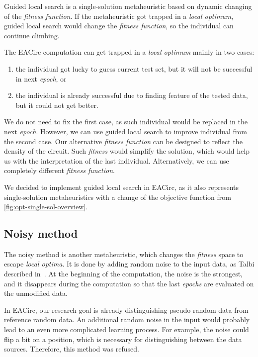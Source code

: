\documentclass[
    digital,    %
    oneside,    %
    color,
    11pt,
    nocover,
    notable,
    nolof,
    nolot,
]{fithesis3}
\begin{document}
Guided local search is a single-solution metaheuristic based on dynamic changing of the \textit{fitness function}. If the metaheuristic got trapped in a \textit{local optimum}, guided local search would change the \textit{fitness function}, so the individual can continue climbing.

The EACirc computation can get trapped in a \textit{local optimum} mainly in two cases:

\begin{enumerate}[noitemsep,topsep=3pt,parsep=3pt,partopsep=3pt]
    \item the individual got lucky to guess current test set, but it will not be successful in next \textit{epoch}, or
    \item the individual is already successful due to finding feature of the tested data, but it could not get better.
\end{enumerate}

We do not need to fix the first case, as such individual would be replaced in the next \textit{epoch}. However, we can use guided local search to improve individual from the second case. Our alternative \textit{fitness function} can be designed to reflect the density of the circuit. Such \textit{fitness} would simplify the solution, which would help us with the interpretation of the last individual. Alternatively, we can use completely different \textit{fitness function}.

We decided to implement guided local search in EACirc, as it also represents single-solution metaheuristics with a change of the objective function from \cref{fig:opt-single-sol-overview}.

\subsection{Noisy method}
\label{subsec:opt-single-sol-nois}

The noisy method is another metaheuristic, which changes the \textit{fitness} space to escape \textit{local optima}. It is done by adding random noise to the input data, as Talbi described in~\cite[Section 2.9.2]{talbi2009metaheuristics}. At the beginning of the computation, the noise is the strongest, and it disappears during the computation so that the last \textit{epochs} are evaluated on the unmodified data.

In EACirc, our research goal is already distinguishing pseudo-random data from reference random data. An additional random noise in the input would probably lead to an even more complicated learning process. For example, the noise could flip a bit on a position, which is necessary for distinguishing between the data sources. Therefore, this method was refused.
\end{document}
